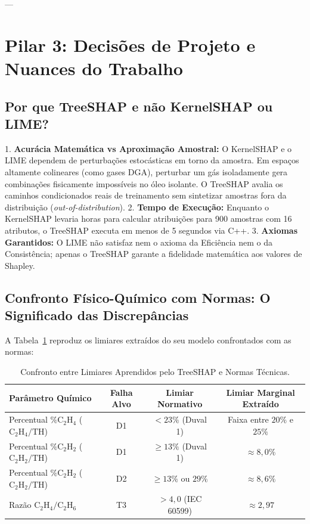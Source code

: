 \documentclass[11pt,a4paper]{article}
\begin{document}
---

\section{Pilar 3: Decisões de Projeto e Nuances do Trabalho}

\subsection{Por que TreeSHAP e não KernelSHAP ou LIME?}

1. \textbf{Acurácia Matemática vs Aproximação Amostral:} O KernelSHAP e o LIME dependem de perturbações estocásticas em torno da amostra. Em espaços altamente colineares (como gases DGA), perturbar um gás isoladamente gera combinações fisicamente impossíveis no óleo isolante. O TreeSHAP avalia os caminhos condicionados reais de treinamento sem sintetizar amostras fora da distribuição (\textit{out-of-distribution}).
2. \textbf{Tempo de Execução:} Enquanto o KernelSHAP levaria horas para calcular atribuições para 900 amostras com 16 atributos, o TreeSHAP executa em menos de 5 segundos via C++.
3. \textbf{Axiomas Garantidos:} O LIME não satisfaz nem o axioma da Eficiência nem o da Consistência; apenas o TreeSHAP garante a fidelidade matemática aos valores de Shapley.

\subsection{Confronto Físico-Químico com Normas: O Significado das Discrepâncias}

A Tabela~\ref{tab:limiares_confronto} reproduz os limiares extraídos do seu modelo confrontados com as normas:

\begin{table}[H]
\centering
\caption{Confronto entre Limiares Aprendidos pelo TreeSHAP e Normas Técnicas.}
\label{tab:limiares_confronto}
\begin{tabular}{lccc}
\toprule
\textbf{Parâmetro Químico} & \textbf{Falha Alvo} & \textbf{Limiar Normativo} & \textbf{Limiar Marginal Extraído} \\
\midrule
Percentual $\% \text{C}_2\text{H}_4$ ($\text{C}_2\text{H}_4/\text{TH}$) & D1 & $< 23\%$ (Duval 1) & Faixa entre $20\%$ e $25\%$ \\
Percentual $\% \text{C}_2\text{H}_2$ ($\text{C}_2\text{H}_2/\text{TH}$) & D1 & $\ge 13\%$ (Duval 1) & $\approx 8{,}0\%$ \\
Percentual $\% \text{C}_2\text{H}_2$ ($\text{C}_2\text{H}_2/\text{TH}$) & D2 & $\ge 13\%$ ou $29\%$ & $\approx 8{,}6\%$ \\
Razão $\text{C}_2\text{H}_4/\text{C}_2\text{H}_6$ & T3 & $> 4{,}0$ (IEC 60599) & $\approx 2{,}97$ \\
\bottomrule
\end{tabular}
\end{table}
\end{document}
